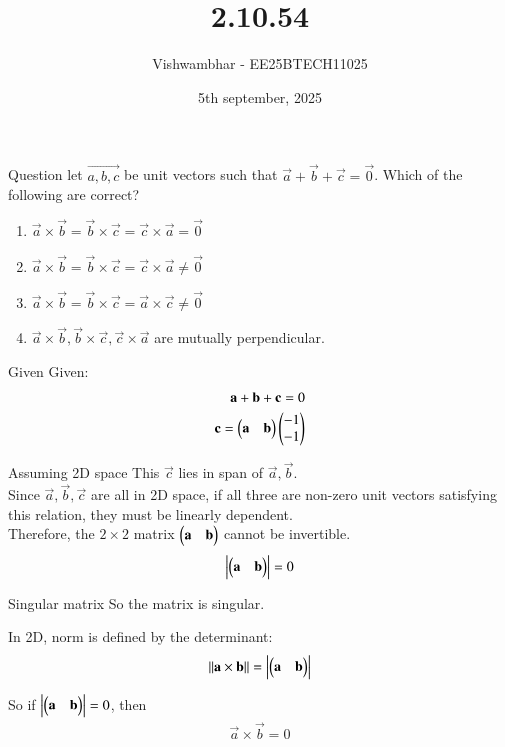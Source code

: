\documentclass{beamer}
\title{2.10.54}
\date{5th september, 2025}
\author{Vishwambhar - EE25BTECH11025}
\begin{document}
\frame{\titlepage}
\begin{frame}{Question}
let $\vec{a, b,c}$ be unit vectors such that $\vec{a}+\vec{b}+\vec{c}=\vec{0}$. Which of the following are correct?\\
\begin{enumerate}
    \item $\vec{a}\times \vec{b}=\vec{b}\times \vec{c}=\vec{c}\times \vec{a}=\vec{0}$
    \item $\vec{a}\times \vec{b}=\vec{b}\times \vec{c}=\vec{c}\times \vec{a}\neq \vec{0}$
    \item $\vec{a}\times \vec{b}=\vec{b}\times \vec{c}=\vec{a}\times \vec{c}\neq \vec{0}$
    \item $\vec{a}\times \vec{b},\vec{b}\times \vec{c}, \vec{c}\times \vec{a}$ are mutually perpendicular.
\end{enumerate}
\end{frame}

\begin{frame}{Given}
Given:
\begin{align}
    \mathbf{a}+\mathbf{b}+\mathbf{c}=0\\
    \mathbf{c}= \begin{pmatrix}\mathbf{a}&\mathbf{b}\end{pmatrix}\begin{pmatrix}-1\\-1\end{pmatrix}\\
\end{align}
\end{frame}

\begin{frame}{Assuming 2D space}
This $\vec{c}$ lies in span of $\vec{a}, \vec{b}$.\\

Since $\vec{a}, \vec{b}, \vec{c}$ are all in 2D space, if all three are non-zero unit vectors satisfying this relation, they must be linearly dependent.\\

Therefore, the $2\times2$ matrix $\begin{pmatrix}\mathbf{a}&\mathbf{b}\end{pmatrix}$ cannot be invertible.
\begin{align}
    \mdet{\myvec{\vec{a}&\vec{b}}}=0
\end{align}
\end{frame}

\begin{frame}{Singular matrix}
So the matrix is singular.

In 2D, norm is defined by the determinant:
\begin{align}
    ||\vec{a}\times\vec{b}||=\mdet{\myvec{\vec{a}&\vec{b}}}
\end{align}

So if $\mdet{\myvec{\vec{a}&\vec{b}}}=0$, then
\begin{align}
    \vec{a}\times\vec{b}=0
\end{align}
\end{frame}
\end{document}
